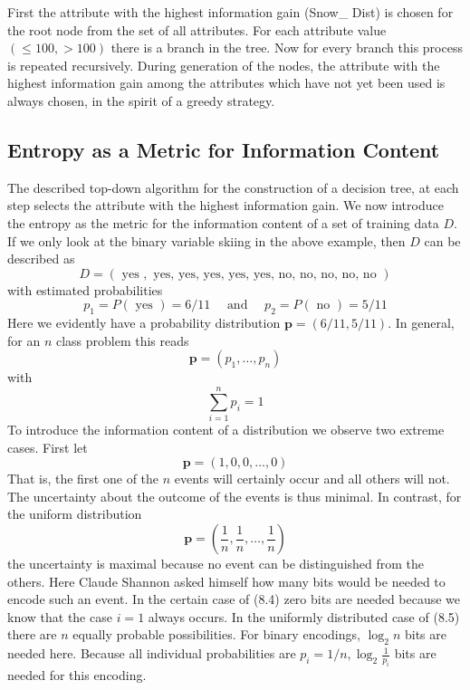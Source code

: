 \documentclass[10pt]{book}
\begin{document}
First the attribute with the highest information gain (Snow\_ Dist) is chosen for the root node from the set of all attributes. For each attribute value $(\leq 100,>100)$ there is a branch in the tree. Now for every branch this process is repeated recursively. During generation of the nodes, the attribute with the highest information gain among the attributes which have not yet been used is always chosen, in the spirit of a greedy strategy.
\subsection{Entropy as a Metric for Information Content}
The described top-down algorithm for the construction of a decision tree, at each step selects the attribute with the highest information gain. We now introduce the entropy as the metric for the information content of a set of training data $D$. If we only look at the binary variable skiing in the above example, then $D$ can be described as
$$
D=(\text { yes }, \text { yes, yes, yes, yes, yes, no, no, no, no, no })
$$
with estimated probabilities
$$
p_{1}=P(\text { yes })=6 / 11 \quad \text { and } \quad p_{2}=P(\text { no })=5 / 11
$$
Here we evidently have a probability distribution $\boldsymbol{p}=(6 / 11,5 / 11)$. In general, for an $n$ class problem this reads
$$
\boldsymbol{p}=\left(p_{1}, \ldots, p_{n}\right)
$$
with
$$
\sum_{i=1}^{n} p_{i}=1
$$
To introduce the information content of a distribution we observe two extreme cases. First let
\begin{equation*}
\boldsymbol{p}=(1,0,0, \ldots, 0) \tag{8.4}
\end{equation*}
That is, the first one of the $n$ events will certainly occur and all others will not. The uncertainty about the outcome of the events is thus minimal. In contrast, for the uniform distribution
\begin{equation*}
\boldsymbol{p}=\left(\frac{1}{n}, \frac{1}{n}, \ldots, \frac{1}{n}\right) \tag{8.5}
\end{equation*}
the uncertainty is maximal because no event can be distinguished from the others. Here Claude Shannon asked himself how many bits would be needed to encode such an event. In the certain case of (8.4) zero bits are needed because we know that the case $i=1$ always occurs. In the uniformly distributed case of (8.5) there are $n$ equally probable possibilities. For binary encodings, $\log _{2} n$ bits are needed here. Because all individual probabilities are $p_{i}=1 / n, \log _{2} \frac{1}{p_{i}}$ bits are needed for this encoding.
\end{document}
